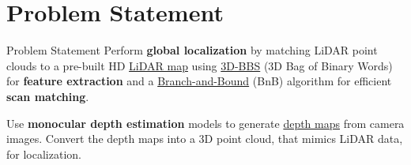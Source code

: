 \section{Problem Statement}

\begin{frame}{Problem Statement}
Perform \textbf{global localization} by matching LiDAR point clouds to a pre-built HD \underline{LiDAR map} using \underline{3D-BBS} (3D Bag of Binary Words) for \textbf{feature extraction} and a \underline{Branch-and-Bound} (BnB) algorithm for efficient \textbf{scan matching}.

\vspace{1em}

Use \textbf{monocular depth estimation} models to generate \underline{depth maps} from camera images. Convert the depth maps into a 3D point cloud, that mimics LiDAR data, for localization.
\end{frame}
